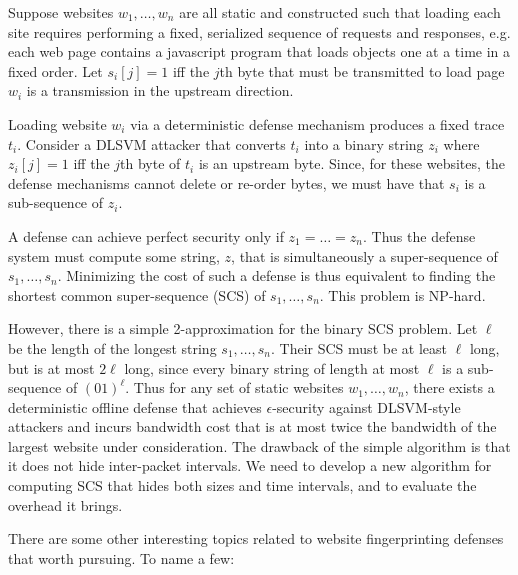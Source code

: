 \documentclass[11pt,oneside]{article}
\begin{document}
Suppose websites $w_1,\dots,w_n$ are all static and constructed such that
loading each site requires performing a fixed, serialized sequence of requests
and responses, e.g. each web page contains a javascript program that loads
objects one at a time in a fixed order.  Let $s_i[j]=1$ iff the $j$th byte that
must be transmitted to load page $w_i$ is a transmission in the upstream
direction.  

Loading website $w_i$ via a deterministic defense mechanism produces a fixed
trace $t_i$.  Consider a DLSVM attacker that converts $t_i$ into a binary
string $z_i$ where $z_i[j]=1$ iff the $j$th byte of $t_i$ is an upstream byte.
Since, for these websites, the defense mechanisms cannot delete or re-order
bytes, we must have that $s_i$ is a sub-sequence of $z_i$.

A defense can achieve perfect security only if $z_1=\dots=z_n$.  Thus the
defense system must compute some string, $z$, that is simultaneously a
super-sequence of $s_1,\dots,s_n$.  Minimizing the cost of such a defense is
thus equivalent to finding the shortest common super-sequence (SCS) of $s_1,
	 \dots, s_n$.  This problem is NP-hard\cite{SCS_SR8}.

However, there is a simple 2-approximation for the binary SCS problem.  Let
$\ell$ be the length of the longest string $s_1,\dots,s_n$.  Their SCS must be
at least $\ell$ long, but is at most $2\ell$ long, since every binary string of
length at most $\ell$ is a sub-sequence of $(01)^\ell$.  Thus for any set of
static websites $w_1,\dots,w_n$, there exists a deterministic offline defense
that achieves $\epsilon$-security against DLSVM-style attackers and incurs
bandwidth cost that is at most twice the bandwidth of the largest website under
consideration. The drawback of the simple algorithm is that it does not hide
inter-packet intervals. We need to develop a new algorithm for computing SCS
that hides both sizes and time intervals, and to evaluate the overhead it
brings.

There are some other interesting topics related to website fingerprinting
defenses that worth pursuing. To name a few:
\end{document}
